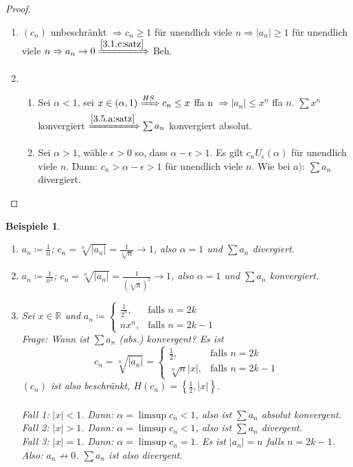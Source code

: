 \documentclass{extreport}
\newcommand{\R}{\mathbb{R}}
\theoremstyle{named}
\theoremstyle{dotless}
\newtheorem*{beispiele}{Beispiele}
\begin{document}
\begin{proof} ~\
	\begin{enumerate}
		\item $(c_{n})$ unbeschränkt $\Rightarrow c_{n} \geq 1$ für unendlich viele $n \Rightarrow |a_{n}| \geq 1$ für unendlich viele $n \Rightarrow a_{n} \rightarrow 0 \xRightarrow[]{\ref{3.1.c:satz}}$ Beh.
		\item  %
			\begin{enumerate}
				\item Sei $\alpha < 1$, sei $x \in (\alpha, 1) \xRightarrow[]{HS} c_{n} \leq x$ ffa n $\Rightarrow |a_{n}| \leq x^{n}$ ffa $n$. $\sum x^{n}$ konvergiert $\xRightarrow[]{\ref{3.5.a:satz}} \sum a_{n}$ konvergiert absolut. 
				\item Sei $\alpha > 1$, wähle $\epsilon > 0$ so, dass $\alpha - \epsilon > 1$. Es gilt $c_{n} U_{\epsilon}(\alpha)$ für unendlich viele $n$. Dann: $c_{n} > \alpha - \epsilon > 1$ für unendlich viele $n$. Wie bei $a)$: $\sum a_{n}$ divergiert. 
			\end{enumerate}
	\end{enumerate}
\end{proof}


\begin{beispiele} ~\
	\begin{enumerate}
		\item $a_{n} \coloneqq \frac{1}{n}$; $c_{n} = \sqrt[n]{|a_{n}|} = \frac{1}{\sqrt[n]{n}} \rightarrow 1$, also $\alpha = 1$ und $\sum a_{n}$ divergiert.
		\item $a_{n} \coloneqq \frac{1}{n^{2}}$; $c_{n} = \sqrt[n]{|a_{n}|} = \frac{1}{(\sqrt[n]{n})^{2}} \rightarrow 1$, also $\alpha = 1$ und $\sum a_{n}$ konvergiert.
		\item Sei $x \in \R$ und $a_{n} \coloneqq \begin{cases} \frac{1}{2^{n}}, & \text{falls } n = 2k \\ n x^{n}, & \text{falls } n = 2k - 1 \end{cases}$ \\
			Frage: Wann ist $\sum a_{n}$ (abs.) konvergent? Es ist
			$$c_{n} = \sqrt[n]{|a_{n}|} = \begin{cases}
				\frac{1}{2}, & \text{falls } n = 2k \\ \sqrt[n]{n}|x|, & \text{falls } n = 2k - 1
			\end{cases}$$
			$(c_{n})$ ist also beschränkt, $H(c_{n}) = \left\{ \frac{1}{2}, |x| \right\}$. \\ \\
			Fall 1: $|x| < 1$. Dann: $\alpha = \limsup c_{n} < 1$, also ist $\sum a_{n}$ absolut konvergent. \\
			Fall 2: $|x| > 1$. Dann: $\alpha = \limsup c_{n} < 1$, also ist $\sum a_{n}$ divergent. \\
			Fall 3: $|x| = 1$. Dann: $\alpha = \limsup c_{n} = 1$. Es ist $|a_{n}| = n$ falls $n = 2k - 1$. Also: $a_{n} \not\rightarrow 0$. $\sum a_{n}$ ist also divergent.			
	\end{enumerate}	
\end{beispiele}
\end{document}
